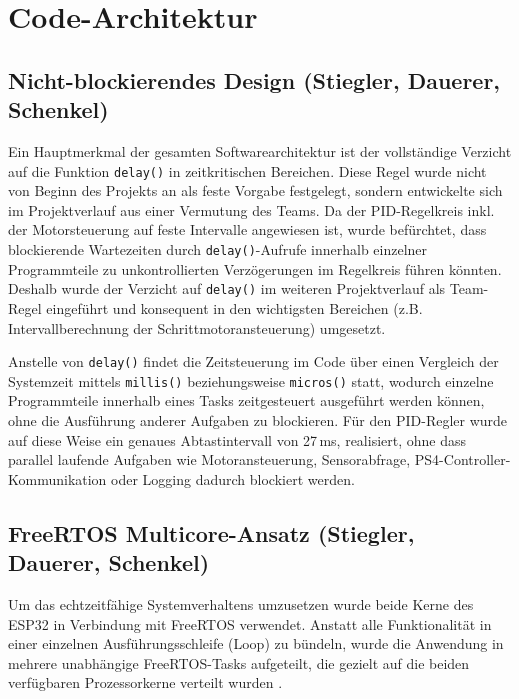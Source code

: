 \documentclass[fontsize=12pt,
parskip=half,	%
department=FakM,  %
logostyle=flat,
twoside, %
DIV=15,BCOR=10mm, %
]{OTHRreprt}
\begin{document}
\section{Code-Architektur}
\label{sec:code_architektur}

\subsection{Nicht-blockierendes Design (Stiegler, Dauerer, Schenkel)}
\label{subsec:nicht_blockierend}

Ein Hauptmerkmal der gesamten Softwarearchitektur ist der vollständige Verzicht auf die Funktion \texttt{delay()} in zeitkritischen Bereichen. Diese Regel wurde nicht von Beginn des Projekts an als feste Vorgabe festgelegt, sondern entwickelte sich im Projektverlauf aus einer Vermutung des Teams. Da der PID-Regelkreis inkl. der Motorsteuerung auf feste Intervalle angewiesen ist, wurde befürchtet, dass blockierende Wartezeiten durch \texttt{delay()}-Aufrufe innerhalb einzelner Programmteile zu unkontrollierten Verzögerungen im Regelkreis führen könnten. Deshalb wurde der Verzicht auf \texttt{delay()} im weiteren Projektverlauf als Team-Regel eingeführt und konsequent in den wichtigsten Bereichen (z.B. Intervallberechnung der Schrittmotoransteuerung) umgesetzt.

Anstelle von \texttt{delay()} findet die Zeitsteuerung im Code über einen Vergleich der Systemzeit mittels \texttt{millis()} beziehungsweise \texttt{micros()} statt, wodurch einzelne Programmteile innerhalb eines Tasks zeitgesteuert ausgeführt werden können, ohne die Ausführung anderer Aufgaben zu blockieren. Für den PID-Regler wurde auf diese Weise ein genaues Abtastintervall von 27\,ms, realisiert, ohne dass parallel laufende Aufgaben wie Motoransteuerung, Sensorabfrage, PS4-Controller-Kommunikation oder Logging dadurch blockiert werden.

\subsection{FreeRTOS Multicore-Ansatz (Stiegler, Dauerer, Schenkel)}
\label{subsec:freertos_multicore}

Um das echtzeitfähige Systemverhaltens umzusetzen wurde beide Kerne des ESP32 in Verbindung mit FreeRTOS verwendet. Anstatt alle Funktionalität in einer einzelnen Ausführungsschleife (Loop) zu bündeln, wurde die Anwendung in mehrere unabhängige FreeRTOS-Tasks aufgeteilt, die gezielt auf die beiden verfügbaren Prozessorkerne verteilt wurden \cite{freertos_ug}.
\end{document}
